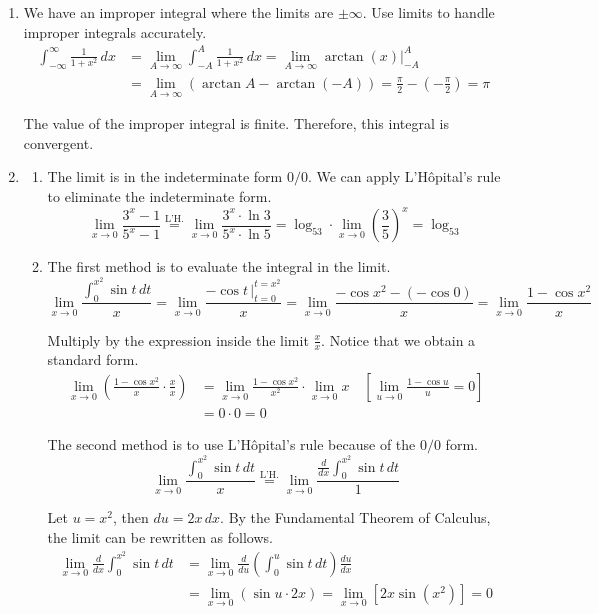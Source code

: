 \documentclass[a4paper, 12pt]{article}
\begin{document}
\begin{enumerate}[leftmargin=*,label=\textbf{\arabic*.}]
\item We have an improper integral where the limits are $\pm\infty$. Use limits to handle improper integrals accurately.
\begin{align*}
\int_{-\infty}^\infty\frac1{1+x^2}\,dx&=\lim_{A\to\infty}\int_{-A}^A\frac1{1+x^2}\,dx = \lim_{A\to\infty}\arctan(x)\bigg|_{-A}^A\\[1em]&=\lim_{A\to\infty}\left(\arctan A-\arctan(-A)\right)=\frac\pi2-\left(-\frac\pi2\right)=\boxed\pi
\end{align*}

The value of the improper integral is finite. Therefore, this integral is convergent.

\item \begin{enumerate}[leftmargin=*,label=\textbf{\alph*.}]
\item The limit is in the indeterminate form $0/0$. We can apply L'Hôpital's rule to eliminate the indeterminate form.
\[\lim_{x\to0}\frac{3^x-1}{5^x-1}\overset{\text{L'H.}}{=}\lim_{x\to0}\frac{3^x\cdot\ln3}{5^x\cdot\ln5}=\log_53\cdot\lim_{x\to0}\left(\frac35\right)^x=\boxed{\log_53}\]

\item The first method is to evaluate the integral in the limit.
\[\lim_{x\to0}\frac{\displaystyle\int_0^{x^2}\sin t\,dt}x=\lim_{x\to0} \frac{-\cos t\,\bigg|_{t=0}^{t=x^2}}x=\lim_{x\to0}\frac{-\cos x^2-(-\cos0)}x=\lim_{x\to0}\frac{1-\cos x^2}x\]

Multiply by the expression inside the limit $\displaystyle \frac xx$. Notice that we obtain a standard form.
\begin{align*}\lim_{x\to0}\left(\frac{1-\cos x^2}x\cdot\frac xx\right)&=\lim_{x\to0}\frac{1-\cos x^2}{x^2}\cdot\lim_{x\to0}x\quad\left[\lim_{u\to0}\frac{1-\cos u}u = 0\right]\\[1em]&=0\cdot0=\boxed0\end{align*}

The second method is to use L'Hôpital's rule because of the $0/0$ form.
\[\lim_{x\to0}\frac{\displaystyle\int_0^{x^2}\sin t\,dt}x\overset{\text{L'H.}}{=}\lim_{x\to0}\frac{\displaystyle\frac d{dx}\int_0^{x^2}\sin t\,dt}1\]

Let $u=x^2$, then $du=2x\,dx$. By the Fundamental Theorem of Calculus, the limit can be rewritten as follows.
\begin{align*}
\lim_{x\to0}\frac{d}{dx}\int_0^{x^2}\sin t\,dt
&= \lim_{x\to0}\frac{d}{du}\left(\int_0^u\sin t\,dt\right)\frac{du}{dx} \\[1em]
&= \lim_{x\to0}\left(\sin u\cdot2x\right)
 = \lim_{x\to0}\left[2x\sin\left(x^2\right)\right]
 = \boxed{0}
\end{align*}
\end{enumerate}


\end{enumerate}
\end{document}
